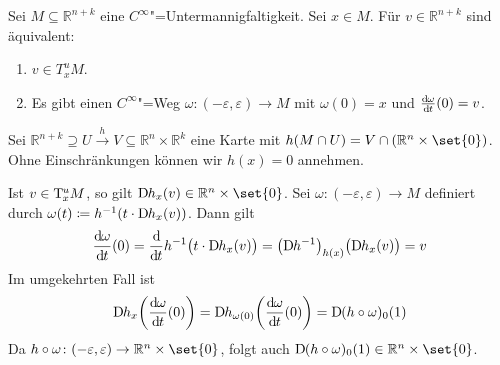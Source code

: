 \begin{lemma}[{name=[Tangentialvektoren als Geschwindigkeitsvektoren]},label=lem:tang-geschw]
	Sei $M \subseteq \mathbb{R}^{n+k}$ eine $C^\infty$"=Untermannigfaltigkeit. 
	Sei $x \in M$. 
	Für $v \in \mathbb{R}^{n+k}$ sind äquivalent:
	\begin{enumerate}[(1)]
		\item $v \in T^u_x M$.
		\item Es gibt einen $C^\infty$"=Weg $\omega \colon (-\varepsilon, \varepsilon) \to M$ mit $\omega(0)=x$ und $\frac{\mathrm{d}\mkern-1.0mu \omega}{\mathrm{d}\mkern-1.0mu t} (0)=v$.
	\end{enumerate}
\end{lemma}
\begin{beweis}
	Sei $\mathbb{R}^{n+k} \supseteq U \xrightarrow{h} V \subseteq \mathbb{R}^n \times \mathbb{R}^k $ eine Karte mit $h(M \cap U) = V \cap (\mathbb{R}^n \times \set{0})$.
	Ohne Einschränkungen können wir $h(x)=0$ annehmen.
	
	Ist $v \in \mathrm{T}\mkern-0.85mu_x^u M$, so gilt $\D h_x (v) \in \mathbb{R}^n \times \set{0}$. 
	Sei $\omega \colon (-\varepsilon,\varepsilon) \to M$ definiert durch $\omega(t) \coloneqq h^{-1} \enbrace*{t \cdot \D h_x(v)}$. Dann gilt
	\begin{align*}
		\diffd{\omega}{t}(0) = \diffd{}{t} h ^{-1} \enbrace[\big]{t \cdot \D h_x(v)} = \enbrace*{\D h ^{-1}}_{h(x)} \enbrace[\big]{\D h_x (v)} = v
	\end{align*}
	Im  umgekehrten Fall ist
	\begin{align*}
		\D h_x \enbrace*{\diffd{\omega}{t}(0)} = \D h_{\omega(0)} \enbrace*{\diffd{\omega}{t}(0)} = \D(h \circ \omega)_0 (1) 
	\end{align*}
	Da $h \circ \omega \colon (-\varepsilon,\varepsilon) \to \mathbb{R}^n \times \set{0}$, folgt auch $\D(h \circ \omega)_0 (1) \in \mathbb{R}^n \times \set{0}$.
\end{beweis}

